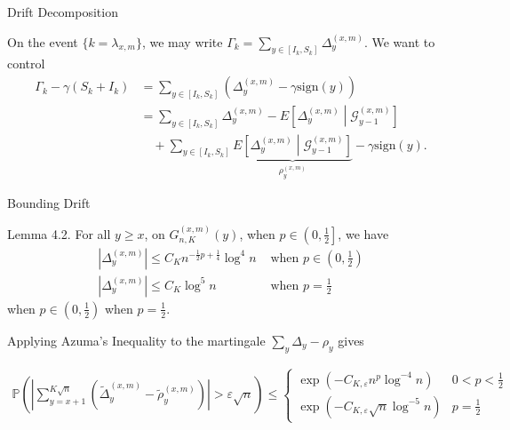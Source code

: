 \documentclass{if-beamer}
\begin{document}
\begin{frame}{Drift Decomposition}
    \begin{block}{}
	    On the event $\{k = \lambda_{x, m}\}$, we may write $\Gamma_k = \sum_{y \in [I_k, S_k]} \Delta_y^{(x, m)}$. We want to control
	    \begin{align*}
		    \Gamma_k - \gamma(S_k + I_k) 
		    &= \sum_{y \in [I_k, S_k]} 
		    \left( \Delta_y^{(x,m)} - \gamma \text{sign}(y) \right) \\
		    &= \sum_{y \in [I_k, S_k]} \Delta_y^{\left( x,m \right) } - E\left[ \Delta_y^{(x, m)} \middle| \mathcal{G}_{y - 1}^{(x, m)} \right]  \\
		    &\quad + \sum_{y \in [I_k, S_k]} \underbrace{ E\left[ \Delta_y^{(x,m)} \middle| \mathcal{G}_{y - 1}^{(x, m)} \right]}_{\text{$\rho_y^{(x,m)}$}}  - \gamma \text{sign}(y)  
	    .\end{align*}
    \end{block}

\end{frame}

\begin{frame}{Bounding Drift}
	\begin{block}{}
		Lemma 4.2. For all $y \geq x$, on $G_{n, K}^{(x, m)}(y)$, when $p \in\left(0, \frac{1}{2}\right]$, we have
\[
\begin{array}{ll}
\left|\Delta_y^{(x, m)}\right| \leq C_K n^{-\frac{1}{2} p+\frac{1}{4}} \log ^4 n & \text { when } p \in\left(0, \frac{1}{2}\right) \\
\left|\Delta_y^{(x, m)}\right| \leq C_K \log ^5 n & \text { when } p=\frac{1}{2}
\end{array}
\]
when $p \in\left(0, \frac{1}{2}\right)$
when $p=\frac{1}{2}$.
	\end{block}

	Applying Azuma's Inequality to the martingale $\sum_y \Delta_y - \rho_y$  gives

	\begin{block}{}
	\begin{align}
\mathbb{P}\left(\left|\sum_{y=x+1}^{K \sqrt{n}}\left(\tilde{\Delta}_y^{(x, m)}-\tilde{\rho}_y^{(x, m)}\right)\right|>\varepsilon \sqrt{n}\right) \leq \begin{cases}\exp \left(-C_{K, \varepsilon} n^p \log ^{-4} n\right) & 0<p<\frac{1}{2} \\ \exp \left(-C_{K, \varepsilon} \sqrt{n} \log ^{-5} n\right) & p=\frac{1}{2}\end{cases}
\end{align}
\end{block}
\end{frame}
\end{document}
